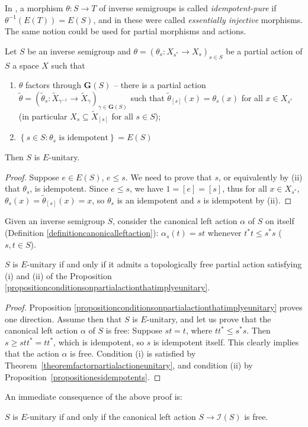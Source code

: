 In \cite{MR2221438}, a morphism $\theta:S\to T$ of inverse semigroups is called \emph{idempotent-pure} if $\theta^{-1}(E(T))=E(S)$, and in \cite{MR3231479} these were called \emph{essentially injective} morphisms. The same notion could be used for partial morphisms and actions.

\begin{proposition}\label{propositionconditionsonpartialactionthatimplyeunitary}
Let $S$ be an inverse semigroup and $\theta=\left(\theta_s:X_{s^*}\to X_s\right)_{s\in S}$ be a partial action of $S$ a space $X$ such that
\begin{enumerate}
\item[(i)] $\theta$ factors through $\mathbf{G}(S)$ -- there is a partial action $\widetilde{\theta}=\left(\widetilde{\theta}_s:\widetilde{X}_{\gamma^{-1}}\to\widetilde{X}_\gamma\right)_{\gamma\in\mathbf{G}(S)}$ such that $\widetilde{\theta}_{[s]}(x)=\theta_s(x)$ for all $x\in X_{s^*}$ (in particular $X_s\subseteq\widetilde{X}_{[s]}$ for all $s\in S$);
\item[(ii)] $\left\{s\in S:\theta_s\text{ is idempotent}\right\}=E(S)$
\end{enumerate}
Then $S$ is $E$-unitary.
\end{proposition}
\begin{proof}
Suppose $e\in E(S)$, $e\leq s$. We need to prove that $s$, or equivalently by (ii) that $\theta_s$, is idempotent. Since $e\leq s$, we have $1=[e]=[s]$, thus for all $x\in X_{s^*}$, $\theta_s(x)=\widetilde{\theta}_{[s]}(x)=x$, so $\theta_s$ is an idempotent and $s$ is idempotent by (ii).\qedhere
\end{proof}

Given an inverse semigroup $S$, consider the canonical left action $\alpha$ of $S$ on itself (Definition \ref{definitioncanonicalleftaction}): $\alpha_s(t)=st$ whenever $t^*t\leq s^*s$ ($s,t\in S$).

\begin{theorem}\label{theoremcharacterizationofeunitaryintermsofactions}
$S$ is $E$-unitary if and only if it admits a topologically free partial action satisfying (i) and (ii) of the Proposition \ref{propositionconditionsonpartialactionthatimplyeunitary}.
\end{theorem}
\begin{proof}
Proposition \ref{propositionconditionsonpartialactionthatimplyeunitary} proves one direction. Assume then that $S$ is $E$-unitary, and let us prove that the canonical left action $\alpha$ of $S$ is free: Suppose $st=t$, where $tt^*\leq s^*s$. Then $s\geq stt^*=tt^*$, which is idempotent, so $s$ is idempotent itself. This clearly implies that the action $\alpha$ is free. Condition (i) is satisfied by Theorem~\ref{theoremfactorpartialactioneunitary}, and condition (ii) by Proposition~\ref{propositionesidempotents}.\qedhere
\end{proof}

An immediate consequence of the above proof is:
\begin{corollary}
$S$ is $E$-unitary if and only if the canonical left action $S\to\mathcal{I}(S)$ is free.
\end{corollary}
